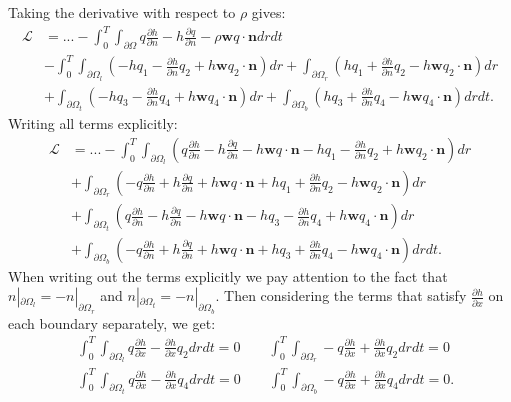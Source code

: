 \documentclass[11pt, a4paper]{article}
\theoremstyle{definition}
\newcommand{\w}{\mathbf{w}}
\newcommand{\n}{\mathbf{n}}
\begin{document}
	Taking the derivative with respect to $\rho$ gives:
	\begin{align*}
		\mathcal{L} &= ... - \int_0^T \int_{\partial \Omega} q \frac{\partial h}{\partial n} - h\frac{\partial q}{\partial n} - \rho \w q  \cdot \n  dr dt\\
		&- \int_0^T \int_{\partial \Omega_l} \left(- h q_1  - \frac{\partial h }{\partial n} q_2 + h \w q_2  \cdot \n \right) dr  + \int_{\partial \Omega_r} \left(h q_1 + \frac{\partial h }{\partial n}q_2 - h \w q_2 \cdot \n  \right) dr  \\
		& + \int_{\partial \Omega_t} \left(- h q_3 - \frac{\partial h }{\partial n} q_4 + h \w q_4 \cdot \n  \right) dr  + \int_{\partial \Omega_b} \left(h q_3 + \frac{\partial h}{\partial n}q_4 - h \w q_4 \cdot \n  \right) drdt.
	\end{align*}
	Writing all terms explicitly:
	\begin{align*}
		\mathcal{L} &= ... - \int_0^T \int_{\partial \Omega_l} \left( q \frac{\partial h}{\partial n} - h\frac{\partial q}{\partial n} - h \w q \cdot \n- h q_1 - \frac{\partial h }{\partial n} q_2 + h \w q_2 \cdot \n \right) dr\\
		&  + \int_{\partial \Omega_r} \left(- q \frac{\partial h}{\partial n} + h\frac{\partial q}{\partial n} + h \w q  \cdot \n + h q_1 + \frac{\partial h }{\partial n}q_2 - h \w q_2 \cdot \n \right) dr  \\
		& + \int_{\partial \Omega_t} \left(q \frac{\partial h}{\partial n} - h\frac{\partial q}{\partial n} - h \w q  \cdot \n- h q_3 - \frac{\partial h }{\partial n} q_4 + h \w q_4 \cdot \n \right) dr\\
		&  + \int_{\partial \Omega_b} \left(-q \frac{\partial h}{\partial n} + h\frac{\partial q}{\partial n} + h \w q  \cdot \n + h q_3 + \frac{\partial h}{\partial n}q_4 - h \w q_4  \cdot \n\right) drdt.
	\end{align*}
	When writing out the terms explicitly we pay attention to the fact that $n|_{\partial \Omega_l} = - n|_{\partial \Omega_r}$ and $n|_{\partial \Omega_t} = - n|_{\partial \Omega_b}$.
	Then considering the terms that satisfy $\frac{\partial h}{\partial x}$ on each boundary separately, we get:
	\begin{align*}
		&\int_0^T \int_{\partial \Omega_l} q \frac{\partial h}{\partial x}- \frac{\partial h }{\partial x} q_2 dr dt= 0 \qquad \int_0^T \int_{\partial \Omega_r} -q \frac{\partial h}{\partial x}+ \frac{\partial h }{\partial x}q_2 dr dt= 0 \\
		&\int_0^T \int_{\partial \Omega_t} q \frac{\partial h}{\partial x}- \frac{\partial h }{\partial x} q_4 dr dt= 0 \qquad \int_0^T \int_{\partial \Omega_b} -q \frac{\partial h}{\partial x}+ \frac{\partial h}{\partial x}q_4 dr dt= 0. \\
	\end{align*}
\end{document}
